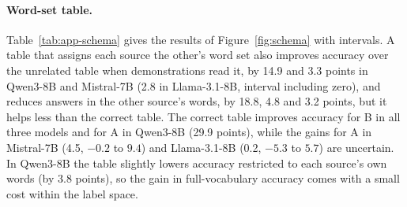 \paragraph{Word-set table.}
Table~\ref{tab:app-schema} gives the results of Figure~\ref{fig:schema} with intervals.
A table that assigns each source the other's word set also improves accuracy over the unrelated table when demonstrations read it, by 14.9 and 3.3 points in Qwen3-8B and Mistral-7B (2.8 in Llama-3.1-8B, interval including zero), and reduces answers in the other source's words, by 18.8, 4.8 and 3.2 points, but it helps less than the correct table.
The correct table improves accuracy for B in all three models and for A in Qwen3-8B (29.9 points), while the gains for A in Mistral-7B (4.5, $-0.2$ to $9.4$) and Llama-3.1-8B (0.2, $-5.3$ to $5.7$) are uncertain.
In Qwen3-8B the table slightly lowers accuracy restricted to each source's own words (by 3.8 points), so the gain in full-vocabulary accuracy comes with a small cost within the label space.

\begin{table}[t]
\centering\small
{}
\caption{Gains in full-vocabulary accuracy (points) from a public word-set table, with 95\% intervals. The first three columns are relative to a table with unrelated names; the last compares the correct with the swapped table, so it equals the first minus the third column. Formation: only demonstrations can read the table; query: only the query can read it.}
\label{tab:app-schema}
\end{table}

